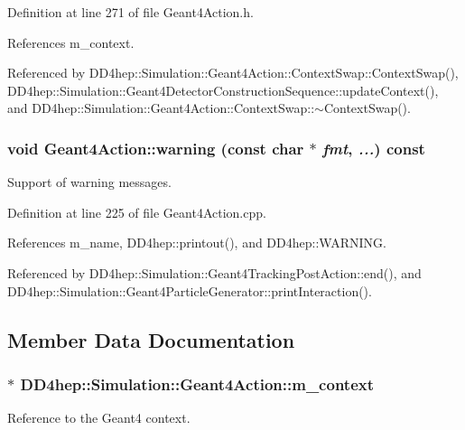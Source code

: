 Definition at line 271 of file Geant4Action.h.

References m\_\-context.

Referenced by DD4hep::Simulation::Geant4Action::ContextSwap::ContextSwap(), DD4hep::Simulation::Geant4DetectorConstructionSequence::updateContext(), and DD4hep::Simulation::Geant4Action::ContextSwap::$\sim$ContextSwap().\hypertarget{class_d_d4hep_1_1_simulation_1_1_geant4_action_ab006988f8f6db3df39a6d90ed1e69a1d}{
\subsubsection[{warning}]{\setlength{\rightskip}{0pt plus 5cm}void Geant4Action::warning (const char $\ast$ {\em fmt}, \/   {\em ...}) const}}
\label{class_d_d4hep_1_1_simulation_1_1_geant4_action_ab006988f8f6db3df39a6d90ed1e69a1d}


Support of warning messages. 

Definition at line 225 of file Geant4Action.cpp.

References m\_\-name, DD4hep::printout(), and DD4hep::WARNING.

Referenced by DD4hep::Simulation::Geant4TrackingPostAction::end(), and DD4hep::Simulation::Geant4ParticleGenerator::printInteraction().

\subsection{Member Data Documentation}
\hypertarget{class_d_d4hep_1_1_simulation_1_1_geant4_action_a5cdb706a8dea3dea288b5b9f65398c1d}{
\subsubsection[{m\_\-context}]{$\ast$ {\bf DD4hep::Simulation::Geant4Action::m\_\-context}}}
\label{class_d_d4hep_1_1_simulation_1_1_geant4_action_a5cdb706a8dea3dea288b5b9f65398c1d}


Reference to the Geant4 context. 

